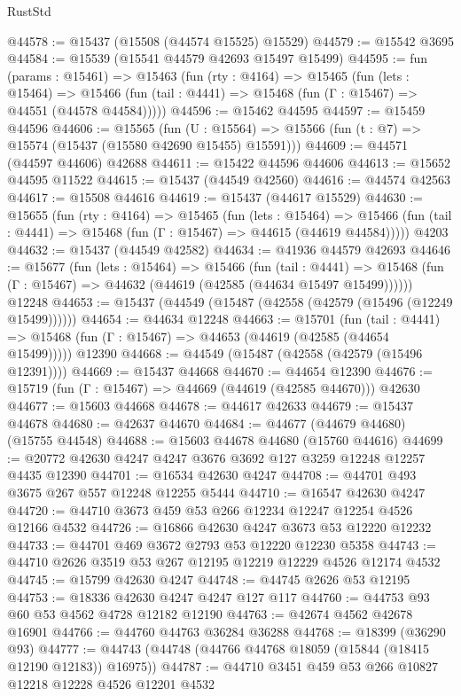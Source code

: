 \begin{lexlean}{RustStd}
\begin{coremodule}
@44578 := @15437 (@15508 (@44574 @15525) @15529)
@44579 := @15542 @3695
@44584 := @15539 (@15541 @44579 @42693 @15497 @15499)
@44595 := fun (params : @15461) =>
  @15463
    (fun (rty : @4164) =>
    @15465
      (fun (lets : @15464) =>
      @15466 (fun (tail : @4441) => @15468 (fun (Γ : @15467) => @44551 (@44578 @44584)))))
@44596 := @15462 @44595
@44597 := @15459 @44596
@44606 := @15565
    (fun (U : @15564) => @15566 (fun (t : @7) => @15574 (@15437 (@15580 @42690 @15455) @15591)))
@44609 := @44571 (@44597 @44606) @42688
@44611 := @15422 @44596 @44606
@44613 := @15652 @44595 @11522
@44615 := @15437 (@44549 @42560)
@44616 := @44574 @42563
@44617 := @15508 @44616
@44619 := @15437 (@44617 @15529)
@44630 := @15655
    (fun (rty : @4164) =>
    @15465
      (fun (lets : @15464) =>
      @15466 (fun (tail : @4441) => @15468 (fun (Γ : @15467) => @44615 (@44619 @44584)))))
    @4203
@44632 := @15437 (@44549 @42582)
@44634 := @41936 @44579 @42693
@44646 := @15677
    (fun (lets : @15464) =>
    @15466
      (fun (tail : @4441) =>
      @15468 (fun (Γ : @15467) => @44632 (@44619 (@42585 (@44634 @15497 @15499))))))
    @12248
@44653 := @15437 (@44549 (@15487 (@42558 (@42579 (@15496 (@12249 @15499))))))
@44654 := @44634 @12248
@44663 := @15701
    (fun (tail : @4441) => @15468 (fun (Γ : @15467) => @44653 (@44619 (@42585 (@44654 @15499)))))
    @12390
@44668 := @44549 (@15487 (@42558 (@42579 (@15496 @12391))))
@44669 := @15437 @44668
@44670 := @44654 @12390
@44676 := @15719 (fun (Γ : @15467) => @44669 (@44619 (@42585 @44670))) @42630
@44677 := @15603 @44668
@44678 := @44617 @42633
@44679 := @15437 @44678
@44680 := @42637 @44670
@44684 := @44677 (@44679 @44680) (@15755 @44548)
@44688 := @15603 @44678 @44680 (@15760 @44616)
@44699 := @20772 @42630 @4247 @4247 @3676 @3692 @127 @3259 @12248 @12257 @4435 @12390
@44701 := @16534 @42630 @4247
@44708 := @44701 @493 @3675 @267 @557 @12248 @12255 @5444
@44710 := @16547 @42630 @4247
@44720 := @44710 @3673 @459 @53 @266 @12234 @12247 @12254 @4526 @12166 @4532
@44726 := @16866 @42630 @4247 @3673 @53 @12220 @12232
@44733 := @44701 @469 @3672 @2793 @53 @12220 @12230 @5358
@44743 := @44710 @2626 @3519 @53 @267 @12195 @12219 @12229 @4526 @12174 @4532
@44745 := @15799 @42630 @4247
@44748 := @44745 @2626 @53 @12195
@44753 := @18336 @42630 @4247 @4247 @127 @117
@44760 := @44753 @93 @60 @53 @4562 @4728 @12182 @12190
@44763 := @42674 @4562 @42678 @16901
@44766 := @44760 @44763 @36284 @36288
@44768 := @18399 (@36290 @93)
@44777 := @44743 (@44748 (@44766 @44768 @18059 (@15844 (@18415 @12190 @12183)) @16975))
@44787 := @44710 @3451 @459 @53 @266 @10827 @12218 @12228 @4526 @12201 @4532

\end{coremodule}
\end{lexlean}

